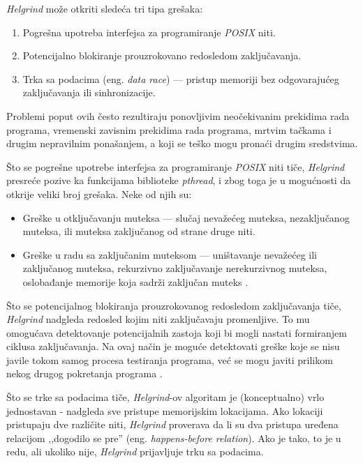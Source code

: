 \documentclass[12pt,oneside]{memoir}
\theoremstyle{plain}
\theoremstyle{definition}
\begin{document}
\textit{Helgrind} može otkriti sledeća tri tipa grešaka:
\begin{enumerate}
\item Pogrešna upotreba interfejsa za programiranje \textit{POSIX} niti.
\item Potencijalno blokiranje prouzrokovano redosledom zaključavanja.
\item Trka sa podacima (eng. \textit{data race}) --- pristup memoriji bez odgovarajućeg zaključavanja ili sinhronizacije.
\end{enumerate}

Problemi poput ovih često rezultiraju ponovljivim neočekivanim prekidima rada programa, vremenski zavisnim prekidima rada programa, mrtvim tačkama i drugim nepravilnim ponašanjem, a koji se teško mogu pronaći drugim sredstvima.

Što se pogrešne upotrebe interfejsa za programiranje \textit{POSIX} niti tiče, \textit{Helgrind} presreće pozive ka funkcijama biblioteke \textit{pthread}, i zbog toga je u mogućnosti da otkrije veliki broj grešaka. Neke od njih su: 
\begin{itemize}
\item Greške u otključavanju muteksa --– slučaj nevažećeg muteksa, nezaključanog muteksa, ili muteksa zaključanog od strane druge niti.
\item Greške u radu sa zaključanim muteksom --– uništavanje nevažećeg ili zaključanog muteksa, rekurzivno zaključavanje nerekurzivnog muteksa, oslobađanje memorije koja sadrži zaključan muteks \cite{Helgrind}.
\end{itemize}

Što se potencijalnog blokiranja prouzrokovanog redosledom zaključavanja tiče, \textit{Helgrind} nadgleda redosled kojim niti zaključavaju promenljive. To mu omogućava detektovanje potencijalnih zastoja koji bi mogli nastati formiranjem ciklusa zaključavanja. Na ovaj način je moguće detektovati greške koje se nisu javile tokom samog procesa testiranja programa, već se mogu javiti prilikom nekog drugog pokretanja programa \cite{Helgrind}.

Što se trke sa podacima tiče, \textit{Helgrind}-ov algoritam je (konceptualno) vrlo jednostavan - nadgleda sve pristupe memorijskim lokacijama. Ako lokaciji pristupaju dve različite niti, \textit{Helgrind} proverava da li su dva pristupa uređena relacijom ,,dogodilo se pre'' (eng. \textit{happens-before relation}). Ako je tako, to je u redu, ali ukoliko nije, \textit{Helgrind} prijavljuje trku sa podacima.
\end{document}
